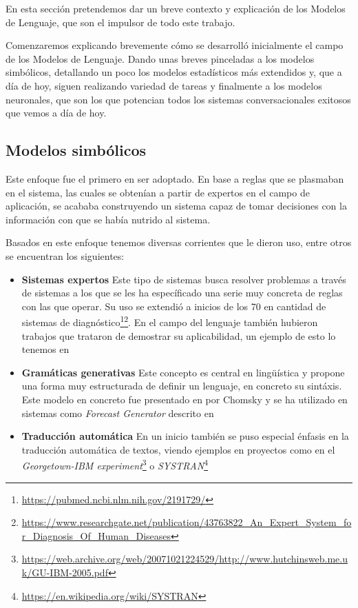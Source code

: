 En esta sección pretendemos dar un breve contexto y explicación de los Modelos de Lenguaje, que son el impulsor de todo este trabajo.

Comenzaremos explicando brevemente cómo se desarrolló inicialmente el campo de los Modelos de Lenguaje. Dando unas breves pinceladas a los modelos simbólicos, detallando un poco los modelos estadísticos más extendidos y, que a día de hoy, siguen realizando variedad de tareas y finalmente a los modelos neuronales, que son los que potencian todos los sistemas conversacionales exitosos que vemos a día de hoy.

\subsection{Modelos simbólicos}

Este enfoque fue el primero en ser adoptado. En base a reglas que se plasmaban en el sistema, las cuales se obtenían a partir de expertos en el campo de aplicación, se acababa construyendo un sistema capaz de tomar decisiones con la información con que se había nutrido al sistema.

Basados en este enfoque tenemos diversas corrientes que le dieron uso, entre otros se encuentran los siguientes:

\begin{itemize}
	\item \textbf{Sistemas expertos} Este tipo de sistemas busca resolver problemas a través de sistemas a los que se les ha específicado una serie muy concreta de reglas con las que operar. Su uso se extendió a inicios de los 70 en cantidad de sistemas de diagnóstico\footnote{\url{https://pubmed.ncbi.nlm.nih.gov/2191729/}}\footnote{\url{https://www.researchgate.net/publication/43763822_An_Expert_System_for_Diagnosis_Of_Human_Diseases}}. En el campo del lenguaje también hubieron trabajos que trataron de demostrar su aplicabilidad, un ejemplo de esto lo tenemos en \cite{winograd1971procedures}
	\item \textbf{Gramáticas generativas} Este concepto es central en lingüística y propone una forma muy estructurada de definir un lenguaje, en concreto su sintáxis. Este modelo en concreto fue presentado en \cite{Chomsky+1957} por Chomsky y se ha utilizado en sistemas como \textit{Forecast Generator} descrito en \cite{goldberg1994using}
	\item \textbf{Traducción automática} En un inicio también se puso especial énfasis en la traducción automática de textos, viendo ejemplos en proyectos como en el \textit{Georgetown-IBM experiment}\footnote{\url{https://web.archive.org/web/20071021224529/http://www.hutchinsweb.me.uk/GU-IBM-2005.pdf}} o \textit{SYSTRAN}\footnote{\url{https://en.wikipedia.org/wiki/SYSTRAN}}
\end{itemize}

